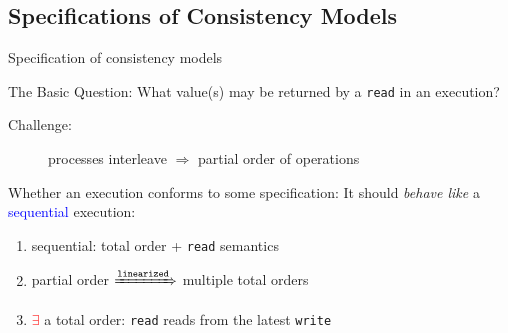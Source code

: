 \documentclass{beamer}
\makeatletter
\newcommand{\citeinbeamer}[3]{{\scriptsize{\textcolor{blue}{[#1@#2'#3]}}}}
\newcommand{\largeblue}[1]{\textcolor{blue}{\large #1}}
\newcommand{\boxedpoint}[1]{
  \begin{center}
    \fbox{\textcolor{red}{\bf #1}}
  \end{center}
}
\newcommand{\setinmath}[1]{\{ #1 \}}
\makeatother
\begin{document}
\subsection{Specifications of Consistency Models}

\begin{frame}{Specification of consistency models}
  \begin{alertblock}{The Basic Question:}
    What value(s) may be returned by a \texttt{read} in an execution?
    \begin{description}
      \item[Challenge:] processes interleave $\Rightarrow$ partial order of
      operations
    \end{description}
  \end{alertblock}


  \begin{center}
    \textcolor{blue}{}
  \end{center}

  \pause
  \begin{block}{Whether an execution conforms to some specification:}
    It should \emph{behave like} a \largeblue{sequential} execution:
    \begin{enumerate}
      \item sequential: total order + \texttt{read} semantics
      \item partial order $\xRightarrow{\texttt{linearized}}$ multiple total orders
      \item {\textcolor{red}{$\mathbf{\exists}$}} a total order: \texttt{read}
      reads from the latest \texttt{write}
    \end{enumerate}
  \end{block}
\end{frame}
\end{document}
